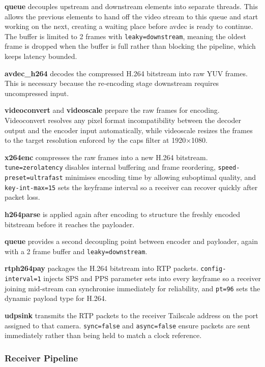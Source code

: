 \textbf{queue} decouples upstream and downstream elements into separate threads. This allows the previous elements to hand off the video stream to this queue and start working on the next, creating a waiting place before avdec is ready to continue. The buffer is limited to 2 frames with \texttt{leaky=downstream}, meaning the oldest frame is dropped when the buffer is full rather than blocking the pipeline, which keeps latency bounded.

\textbf{avdec\_h264} decodes the compressed H.264 bitstream into raw YUV frames. This is necessary because the re-encoding stage downstream requires uncompressed input.

\textbf{videoconvert} and \textbf{videoscale} prepare the raw frames for encoding. Videoconvert resolves any pixel format incompatibility between the decoder output and the encoder input automatically, while videoscale resizes the frames to the target resolution enforced by the caps filter at 1920$\times$1080.

\textbf{x264enc} compresses the raw frames into a new H.264 bitstream. \texttt{tune=zerolatency} disables internal buffering and frame reordering, \texttt{speed-preset=ultrafast} minimises encoding time by allowing suboptimal quality, and \texttt{key-int-max=15} sets the keyframe interval so a receiver can recover quickly after packet loss.

\textbf{h264parse} is applied again after encoding to structure the freshly encoded bitstream before it reaches the payloader.

\textbf{queue} provides a second decoupling point between encoder and payloader, again with a 2 frame buffer and \texttt{leaky=downstream}.

\textbf{rtph264pay} packages the H.264 bitstream into RTP packets. \texttt{config-interval=1} injects SPS and PPS parameter sets into every keyframe so a receiver joining mid-stream can synchronise immediately for reliability, and \texttt{pt=96} sets the dynamic payload type for H.264.

\textbf{udpsink} transmits the RTP packets to the receiver Tailscale address on the port assigned to that camera. \texttt{sync=false} and \texttt{async=false} ensure packets are sent immediately rather than being held to match a clock reference.

\subsubsection{Receiver Pipeline}

